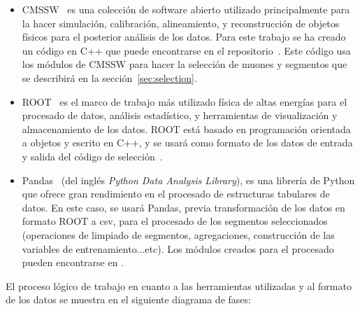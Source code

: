 \begin{itemize}

\item CMSSW~\cite{cmssw} es una colecci\'on de software abierto utilizado principalmente para la hacer simulaci\'on, calibraci\'on, alineamiento, y reconstrucci\'on de objetos f\'isicos para el posterior an\'alisis de los datos. Para este trabajo se ha creado un c\'odigo en C++ que puede encontrarse en el repositorio~\cite{analyzer}. Este c\'odigo usa los m\'odulos de CMSSW para hacer la selecci\'on de muones y segmentos que se describir\'a en la secci\'on~\ref{sec:selection}. 

\item ROOT~\cite{root} es el marco de trabajo m\'as utilizado f\'isica de altas energ\'ias para el procesado de datos, an\'alisis estad\'istico, y herramientas de visualizaci\'on y almacenamiento de los datos. ROOT est\'a basado en programaci\'on orientada a objetos y escrito en C++, y se usar\'a como formato de los datos de entrada y salida del c\'odigo de selecci\'on~\cite{analyzer}.

\item Pandas~\cite{mckinney-proc-scipy-2010} (del ingl\'es \textit{Python Data Analysis Library}), es una librer\'ia de Python que ofrece gran rendimiento en el procesado de estructuras tabulares de datos. En este caso, se usar\'a Pandas, previa transformaci\'on de los datos en formato ROOT a csv, para el procesado de los segmentos seleccionados (operaciones de limpiado de segmentos, agregaciones, construcci\'on de las variables de entrenamiento...etc). Los m\'odulos creados para el procesado pueden encontrarse en \cite{processor}.

\end{itemize}


El proceso l\'ogico de trabajo en cuanto a las herramientas utilizadas y al formato de los datos se muestra en el siguiente diagrama de fases: \\

\begin{center}
\end{center}

